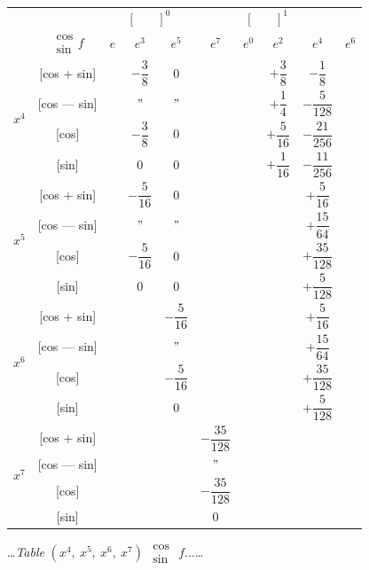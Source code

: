 \documentclass[10pt,a4paper]{article}
\newcommand{\tabletitle}[2]{%
  \begin{center}
  \ldots\textit{Table} #1 $\displaystyle\begin{smallmatrix} \cos \\ \sin \end{smallmatrix}$ #2\ldots
  \end{center}
}
\begin{document}
\begin{center}
\small
\begin{tabular}{|c|c|c|c|c|c|c|c|c|}
\hline
& &  &  \\
& $\begin{smallmatrix} \cos \\ \sin \end{smallmatrix} f$ & $e$ & $e^3$ & $e^5$ & $e^7$ & $e^0$ & $e^2$ & $e^4$ & $e^6$ \\
\hline
{} & [cos + sin] & & $-\dfrac{3}{8}$ & $0$ & & & $+\dfrac{3}{8}$ & $-\dfrac{1}{8}$ \\
& [cos --- sin] & & $"$ & $"$ & & & $+\dfrac{1}{4}$ & $-\dfrac{5}{128}$ \\
& [cos] & & $-\dfrac{3}{8}$ & $0$ & & & $+\dfrac{5}{16}$ & $-\dfrac{21}{256}$ \\
& [sin] & & $0$ & $0$ & & & $+\dfrac{1}{16}$ & $-\dfrac{11}{256}$ \\
\hline
{} & [cos + sin] & & $-\dfrac{5}{16}$ & $0$ & & & & $+\dfrac{5}{16}$ \\
& [cos --- sin] & & $"$ & $"$ & & & & $+\dfrac{15}{64}$ \\
& [cos] & & $-\dfrac{5}{16}$ & $0$ & & & & $+\dfrac{35}{128}$ \\
& [sin] & & $0$ & $0$ & & & & $+\dfrac{5}{128}$ \\
\hline
{} & [cos + sin] & & & $-\dfrac{5}{16}$ & & & & $+\dfrac{5}{16}$ \\
& [cos --- sin] & & & $"$ & & & & $+\dfrac{15}{64}$ \\
& [cos] & & & $-\dfrac{5}{16}$ & & & & $+\dfrac{35}{128}$ \\
& [sin] & & & $0$ & & & & $+\dfrac{5}{128}$ \\
\hline
{} & [cos + sin] & & & & $-\dfrac{35}{128}$ & & & \\
& [cos --- sin] & & & & $"$ & & & \\
& [cos] & & & & $-\dfrac{35}{128}$ & & & \\
& [sin] & & & & $0$ & & & \\
\hline
\end{tabular}
\end{center}

\vspace{1em}

\tabletitle{$(x^4,\ x^5,\ x^6,\ x^7)$}{$f\ldots$}
\end{document}
